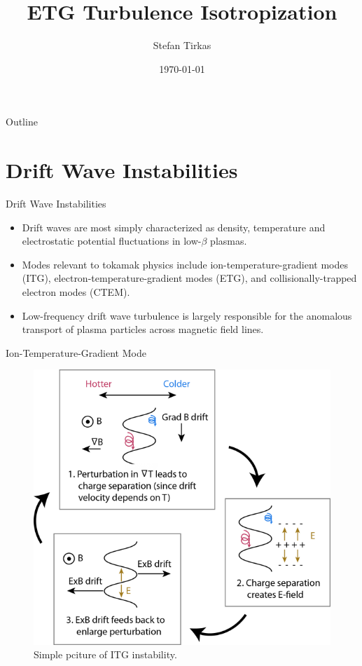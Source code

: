 \documentclass[aspectratio=43]{beamer}
\title{ETG Turbulence Isotropization}
\author[S. Tirkas]{Stefan Tirkas}
\institute[CIPS]{
    CIPS%
    \\%
    University of Colorado, Boulder%
}
\date{\today}
\begin{document}
    
   \frame{\titlepage}
   
   \begin{frame}{Outline}
       \tableofcontents
   \end{frame}
   
   \section{Drift Wave Instabilities}
   
   \begin{frame}{Drift Wave Instabilities}
      \begin{itemize}
         \item Drift waves are most simply characterized as density, temperature and electrostatic potential fluctuations
         in low-$\beta$ plasmas.
         \vspace{5mm}
         \item Modes relevant to tokamak physics include ion-temperature-gradient modes (ITG), electron-temperature-gradient 
         modes (ETG), and collisionally-trapped electron modes (CTEM).
         \vspace{5mm}
         \item Low-frequency drift wave turbulence is largely responsible for the anomalous transport of plasma particles
         across magnetic field lines.
      \end{itemize}
   \end{frame}

   \begin{frame}{Ion-Temperature-Gradient Mode}
      \begin{figure}
         \includegraphics[scale=0.3]{Images/ITG_Instability.png}
         \caption{Simple pciture of ITG instability.}
      \end{figure}
   \end{frame}
\end{document}

